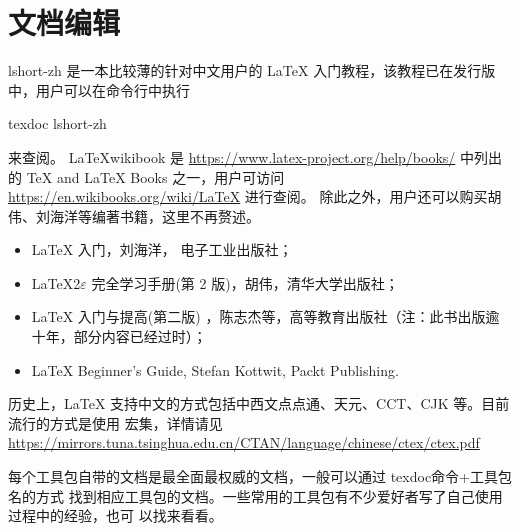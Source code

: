 
\section{文档编辑}


lshort-zh 是一本比较薄的针对中文用户的 \LaTeX{} 入门教程，该教程已在发行版中，用户可以在命令行中执行
\begin{shcode}
  texdoc lshort-zh
\end{shcode}
来查阅。 \LaTeX wikibook 是
\url{https://www.latex-project.org/help/books/} 中列出的 \TeX{} and \LaTeX{} Books 之一，用户可访问
\url{https://en.wikibooks.org/wiki/LaTeX} 进行查阅。
除此之外，用户还可以购买胡伟、刘海洋等编著书籍，这里不再赘述。


\begin{itemize}
\item \LaTeX{} 入门，刘海洋， 电子工业出版社；
\item \LaTeX{2$\varepsilon$} 完全学习手册(第 2 版)，胡伟，清华大学出版社；
\item \LaTeX{} 入门与提高(第二版) ，陈志杰等，高等教育出版社（注：此书出版逾十年，部分内容已经过时）；
\item \LaTeX{} Beginner's Guide, Stefan Kottwit, Packt Publishing.
\end{itemize}


历史上，\LaTeX{} 支持中文的方式包括中西文点点通、天元、CCT、CJK 等。目前流行的方式是使用 \CTeX{} 宏集，详情请见
\url{https://mirrors.tuna.tsinghua.edu.cn/CTAN/language/chinese/ctex/ctex.pdf}











每个工具包自带的文档是最全面最权威的文档，一般可以通过 texdoc命令+工具包名的方式
找到相应工具包的文档。一些常用的工具包有不少爱好者写了自己使用过程中的经验，也可
以找来看看。


